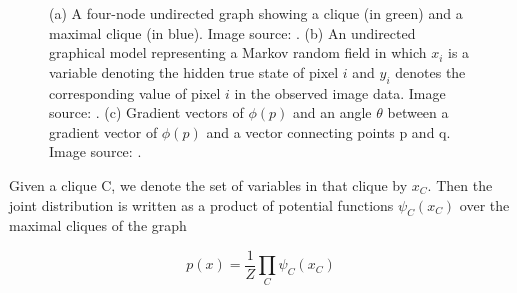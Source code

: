 \documentclass{SMBV12}
\begin{document}
\begin{figure}[htbp]
    \centering
    \caption{(a) A four-node undirected graph showing a clique (in green) and a maximal clique (in blue). Image source: \cite{bishop2006pattern}. (b) An undirected graphical model representing a Markov random field in which $x_i$ is a variable denoting the hidden true state of pixel $i$ and $y_i$ denotes the corresponding value of pixel $i$ in the observed image data. Image source: \cite{bishop2006pattern}. (c) Gradient vectors of $\phi(p)$ and an angle $\theta$ between a gradient vector of $\phi(p)$ and a vector connecting points p and q. Image source: \cite{shimizu2011automated}.}
\end{figure}

Given a clique C, we denote the set of variables in that clique by $x_C$. Then the joint distribution is written as a product of potential functions $\psi_C(x_C)$ over the maximal cliques of the graph

\begin{equation}
p(x) = \frac{1}{Z} \prod\limits_{C} \psi_C(x_C)
\label{eq:joint_distribution}
\end{equation}
\end{document}
